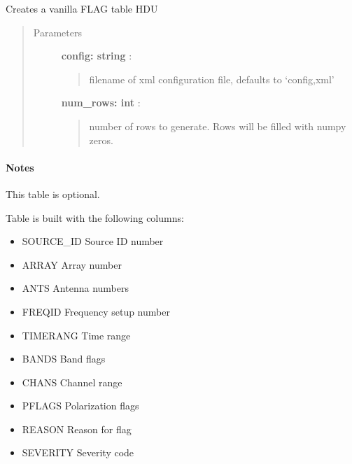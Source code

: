 \documentclass[letterpaper,10pt,english]{sphinxmanual}
\begin{document}

\begin{fulllineitems}
\label{index:pyFitsidi.make_flag}
Creates a vanilla FLAG table HDU
\begin{quote}\begin{description}
\item[{Parameters }] \leavevmode
\textbf{config: string} :
\begin{quote}

filename of xml configuration file, defaults to `config,xml'
\end{quote}

\textbf{num\_rows: int} :
\begin{quote}

number of rows to generate. Rows will be filled with numpy zeros.
\end{quote}

\end{description}\end{quote}
\paragraph{Notes}

This table is optional.

Table is built with the following columns:
\begin{itemize}
\item {} 
SOURCE\_ID Source ID number

\item {} 
ARRAY     Array number

\item {} 
ANTS      Antenna numbers

\item {} 
FREQID    Frequency setup number

\item {} 
TIMERANG  Time range

\item {} 
BANDS     Band flags

\item {} 
CHANS     Channel range

\item {} 
PFLAGS    Polarization flags

\item {} 
REASON    Reason for flag

\item {} 
SEVERITY  Severity code

\end{itemize}

\end{fulllineitems}
\end{document}

